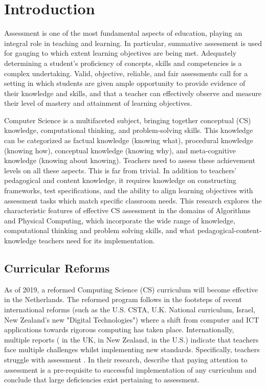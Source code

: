 \section{Introduction}\label{sec:intro}
Assessment is one of the most fundamental aspects of education, playing an integral role in teaching and learning. In particular, summative assessment is used for gauging to which extent learning objectives are being met. Adequately determining a student's proficiency of concepts, skills and competencies is a complex undertaking. Valid, objective, reliable, and fair assessments call for a setting in which students are given ample opportunity to provide evidence of their knowledge and skills, and that a teacher can effectively observe and measure their level of mastery and attainment of learning objectives.

Computer Science is a multifaceted subject, bringing together conceptual (CS) knowledge, computational thinking, and problem-solving skills. This knowledge can be categorized as factual knowledge (knowing what), procedural knowledge (knowing how), conceptual knowledge (knowing why), and meta-cognitive knowledge (knowing about knowing)\cite{streun2001kennis}. Teachers need to assess these achievement levels on all these aspects. This is far from trivial. In addition to teachers' pedagogical and content knowledge, it requires knowledge on constructing frameworks, test specifications, and the ability to align learning objectives with assessment tasks which match specific classroom needs. This research explores the characteristic features of effective CS assessment in the domains of Algorithms and Physical Computing, which incorporate the wide range of knowledge, computational thinking and problem solving skills, and what pedagogical-content-knowledge teachers need for its implementation.




\subsection{Curricular Reforms}


As of 2019, a reformed Computing Science (CS) curriculum will become effective in the Netherlands. The reformed program follows in the footsteps of recent international reforms (such as the U.S. CSTA, U.K. National curriculum, Israel, New Zealand's new "Digital Technologies") where a shift from computer and ICT applications towards rigorous computing has taken place. Internationally, multiple reports ( in the UK,  in New Zealand,  in the U.S.) indicate that teachers face multiple challenges whilst implementing new standards. Specifically, teachers struggle with assessment . In their research,  describe that paying attention to assessment is a pre-requisite to successful implementation of any curriculum and conclude that large deficiencies exist pertaining to assessment. 

